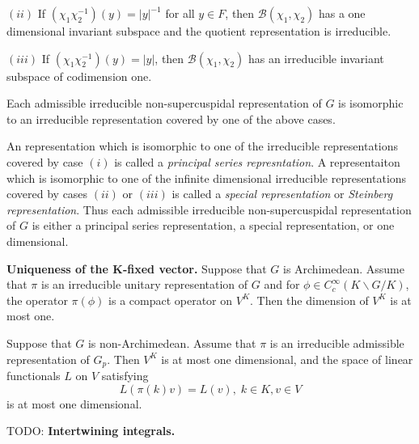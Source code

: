 \documentclass[12pt, letterpaper, twoside]
{article}
\begin{document}
$(ii)$ If $(\chi_1\chi_2^{-1})(y) = |y|^{-1}$ for all $y \in F$, then
$\mathcal{B}(\chi_1, \chi_2)$ has a one dimensional invariant subspace and the
quotient representation is irreducible. 

$(iii)$ If $(\chi_1\chi_2^{-1})(y) = |y|$, then $\mathcal{B}(\chi_1, \chi_2)$
has an irreducible invariant subspace of codimension one.

Each admissible irreducible non-supercuspidal representation of $G$ is
isomorphic to an irreducible representation covered by one of the above cases.

An representation which is isomorphic to one of the irreducible representations
covered by case $(i)$ is called a \textit{principal series represntation}. A
representaiton which is isomorphic to one of the infinite dimensional
irreducible representations covered by cases $(ii)$ or $(iii)$ is called a
\textit{special representation} or \textit{Steinberg representation}. Thus each
admissible irreducible non-supercuspidal representation of $G$ is either a
principal series representation, a special representation, or one dimensional.

\textbf{Uniqueness of the K-fixed vector.} Suppose that $G$ is Archimedean.
Assume that $\pi$ is an irreducible unitary representation of $G$ and for $\phi
\in C_c^\infty(K \backslash G/K)$, the operator $\pi(\phi)$ is a compact
operator on $V^{K}$. Then the dimension of $V^{K}$ is at most one.

Suppose that $G$ is non-Archimedean. Assume that $\pi$ is an irreducible
admissible representation of $G_p$. Then $V^K$ is at most one dimensional, and
the space of linear functionals $L$ on $V$ satisfying
\[L(\pi(k)v) = L(v), \; k \in K, v \in V\] is at most one dimensional.

TODO: \textbf{Intertwining integrals.}
\end{document}
